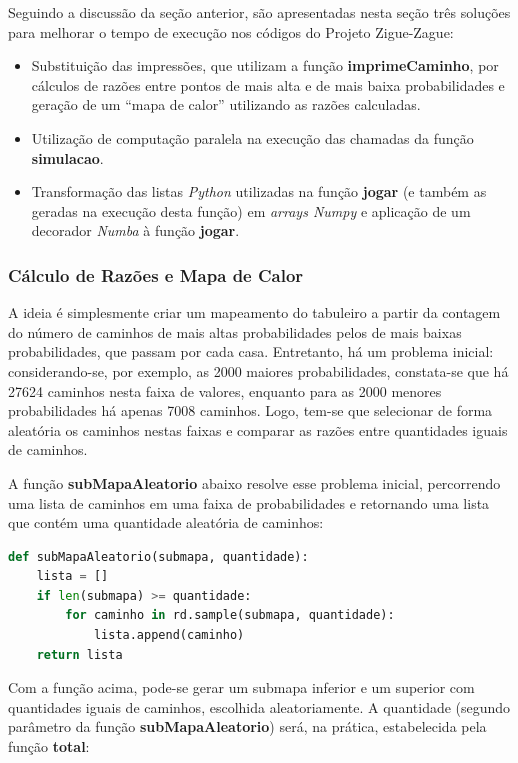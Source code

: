 \documentclass[12pt]{article}
\newcommand{\aspas}[1]{``#1''} %
\begin{document}
Seguindo a discussão da seção anterior, são apresentadas nesta seção três soluções para melhorar o tempo de execução nos códigos do Projeto Zigue-Zague:

\begin{itemize}
	\item Substituição das impressões, que utilizam a função \textbf{imprimeCaminho}, por cálculos de razões entre pontos de mais alta e de mais baixa probabilidades e geração de um \aspas{mapa de calor} utilizando as razões calculadas.
	\item Utilização de computação paralela na execução das chamadas da função \textbf{simulacao}.
	\item Transformação das listas \textit{Python} utilizadas na função \textbf{jogar} (e também as geradas na execução desta função) em \textit{arrays Numpy} e aplicação de um decorador \textit{Numba} à função \textbf{jogar}.
\end{itemize}

\subsubsection{Cálculo de Razões e Mapa de Calor}

A ideia é simplesmente criar um mapeamento do tabuleiro a partir da contagem do número de caminhos de mais altas probabilidades pelos de mais baixas probabilidades, que passam por cada casa. Entretanto, há um problema inicial: considerando-se, por exemplo, as 2000 maiores probabilidades, constata-se que há 27624 caminhos nesta faixa de valores, enquanto para as 2000 menores probabilidades há apenas 7008 caminhos. Logo, tem-se que selecionar de forma aleatória os caminhos nestas faixas e comparar as razões entre quantidades iguais de caminhos.

A função \textbf{subMapaAleatorio} abaixo resolve esse problema inicial, percorrendo uma lista de caminhos em uma faixa de probabilidades e retornando uma lista que contém uma quantidade aleatória de caminhos:

\begin{lstlisting}[language=Python]
def subMapaAleatorio(submapa, quantidade):
	lista = []
	if len(submapa) >= quantidade:
		for caminho in rd.sample(submapa, quantidade):
			lista.append(caminho)
	return lista
\end{lstlisting}

Com a função acima, pode-se gerar um submapa inferior e um superior com quantidades iguais de caminhos, escolhida aleatoriamente. A quantidade (segundo parâmetro da função \textbf{subMapaAleatorio}) será, na prática, estabelecida pela função \textbf{total}:
\end{document}
